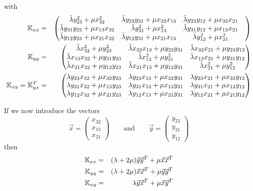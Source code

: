 with
\begin{eqnarray}
{\mathbb{K}}_{xx} &=&  
\begin{pmatrix}
\tilde\lambda y_{23}^ 2 + \mu x_{32}^2 &
\tilde\lambda y_{23}y_{31} + \mu x_{32}x_{13} &
\tilde\lambda y_{23}y_{12} + \mu x_{32}x_{21} \\
\tilde\lambda y_{31}y_{23} + \mu x_{13}x_{32} &
\tilde\lambda y_{31}^2 + \mu x_{13}^2 &
\tilde\lambda y_{31}y_{12} + \mu x_{13}x_{21} \\
\tilde\lambda y_{12}y_{23} + \mu x_{21}x_{32} &
\tilde\lambda y_{12}y_{31} + \mu x_{21}x_{13} &
\tilde\lambda y_{12}^2 + \mu x_{21}^2 &
\end{pmatrix}
\nonumber\\
{\mathbb{K}}_{yy} &=&  
\begin{pmatrix}
\tilde\lambda x_{32}^2 + \mu y_{23}^2 &
\tilde\lambda x_{32}x_{13} + \mu y_{23}y_{31} &
\tilde\lambda x_{32}x_{21} + \mu y_{23}y_{12} 
\\
\tilde\lambda x_{13}x_{32} + \mu y_{31}y_{23} &
\tilde\lambda x_{13}^2 + \mu y_{31}^2 &
\tilde\lambda x_{13}x_{21} + \mu y_{31}y_{12} 
\\
\tilde\lambda x_{21}x_{32} + \mu y_{12}y_{23} &
\tilde\lambda x_{21}x_{13} + \mu y_{12}y_{31} &
\tilde\lambda x_{21}^2 + \mu y_{12}^2 
\end{pmatrix}
\nonumber\\
{\mathbb{K}}_{xy} = {\mathbb{K}}_{yx}^T &=&
\begin{pmatrix}
\lambda y_{23}x_{32} + \mu x_{32}y_{23} &
\lambda y_{23}x_{13} + \mu x_{32}y_{31} &
\lambda y_{23}x_{21} + \mu x_{32}y_{12}  
\\
\lambda y_{31}x_{32} + \mu x_{13}y_{23}  &
\lambda y_{31}x_{13} + \mu x_{13}y_{31}  &
\lambda y_{31}x_{21} + \mu x_{13}y_{12}  
\\
\lambda y_{12}x_{32} + \mu x_{21}y_{23}  &
\lambda y_{12}x_{13} + \mu x_{21}y_{31}  &
\lambda y_{12}x_{21} + \mu x_{21}y_{12}  
\end{pmatrix}
\end{eqnarray}

If we now introduce the vectors
\[
\vec{x} = 
\begin{pmatrix}
x_{32} \\ x_{13} \\ x_{21} 
\end{pmatrix}
\qquad \text{and}
\qquad
\vec{y}=
\begin{pmatrix}
y_{23} \\ y_{31} \\ y_{12}
\end{pmatrix}
\]
then 
\begin{eqnarray}
{\mathbb{K}}_{xx} &=&  (\lambda+2\mu) \vec{y}\vec{y}^T + \mu \vec{x}\vec{x}^T \nonumber\\
{\mathbb{K}}_{yy} &=&  (\lambda+2\mu) \vec{x}\vec{x}^T + \mu \vec{y}\vec{y}^T \nonumber\\
{\mathbb{K}}_{xy} &=& \lambda \vec{y}\vec{x}^T  + \mu \vec{x} \vec{y}^T \nonumber
\end{eqnarray}

